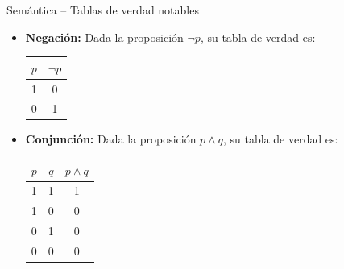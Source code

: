 \documentclass[dvisvgm,hypertex,aspectratio=169]{beamer}
\begin{document}
\begin{frame}{Semántica -- Tablas de verdad notables}
  \begin{itemize}[<+->]
    \item \textbf{Negación:} Dada la proposición $\neg p$, su tabla de verdad es:
    \begin{table}[h]
      \centering
      \begin{tabular}{|c|c|}
        \hline
        $p$ & $\neg p$ \\ \hline
        1 & 0 \\ \hline
        0 & 1 \\ \hline
      \end{tabular}
    \end{table}
    \item \textbf{Conjunción:} Dada la proposición $p \land q$, su tabla de verdad es:
    \begin{table}[h]
      \centering
      \begin{tabular}{|c|c|c|}
        \hline
        $p$ & $q$ & $p \land q$ \\ \hline
        1 & 1 & 1 \\ \hline
        1 & 0 & 0 \\ \hline
        0 & 1 & 0 \\ \hline
        0 & 0 & 0 \\ \hline
      \end{tabular}
    \end{table}
  \end{itemize}
\end{frame}
\end{document}
